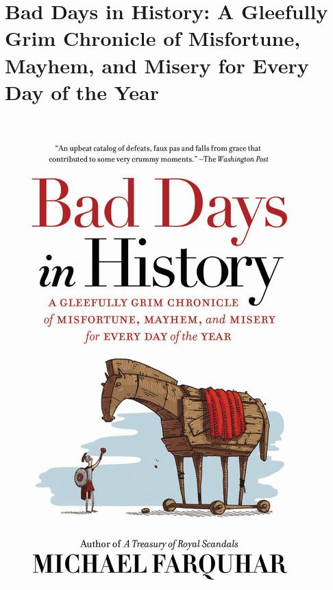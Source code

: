 \documentclass{tufte-handout}
\makeatletter
\newcommand{\varcaption}[2][0pt]{%
  \gsetlength{\@tufte@caption@vertical@offset}{-#1}%
  \gdef\@tufte@stored@varcaption{#2}%
}
\gdef\@tufte@stored@varcaption{} %
\makeatother
\begin{document}
\section*{Bad Days in History: A Gleefully Grim Chronicle of Misfortune, Mayhem, and Misery for Every Day of the Year}
\begin{marginfigure}[8\baselineskip]
   \includegraphics[width=\linewidth]{images/bad_days_in_history.jpg}
   \varcaption{\href{https://www.penguinrandomhouse.com/books/232075/bad-days-in-history-by-michael-farquhar/}{Publisher Link}, \href{https://www.amazon.com/Bad-Days-History-Gleefully-Misfortune/dp/1426218079/}{Amazon Link}}
\end{marginfigure}
\end{document}
